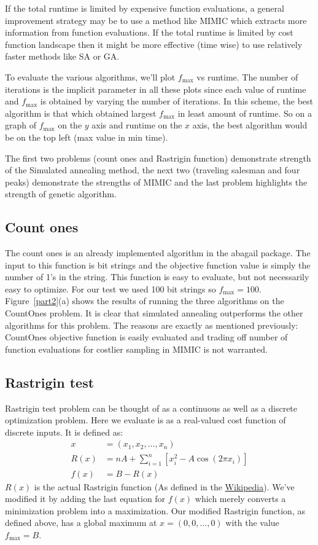 \documentclass[10pt,letterpaper]{article}
\begin{document}
If the total runtime is limited by expensive function evaluations, a general improvement strategy may be to use a method like MIMIC which extracts more information from function evaluations. If the total runtime is limited by cost function landscape then it might be more effective (time wise) to use relatively faster methods like SA or GA. 

To evaluate the various algorithms, we'll plot $f_{\text{max}}$ vs runtime. The number of iterations is the implicit parameter in all these plots since each value of runtime and $f_{\text{max}}$ is obtained by varying the number of iterations. In this scheme, the best algorithm is that which obtained largest $f_{\text{max}}$ in least amount of runtime. So on a graph of $f_{\text{max}}$ on the $y$ axis and runtime on the $x$ axis, the best algorithm would be on the top left (max value in min time).

The first two problems (count ones and Rastrigin function) demonstrate strength of the Simulated annealing method, the next two (traveling salesman and four peaks) demonstrate the strengths of MIMIC and the last problem highlights the strength of genetic algorithm.

\subsection{Count ones}
The count ones is an already implemented algorithm in the {\sc abagail} package. The input to this function is bit strings and the objective function value is simply the number of 1's in the string. This function is easy to evaluate, but not necessarily easy to optimize. For our test we used 100 bit strings so $f_{\text{max}} = 100$. Figure~\ref{part2}(a) shows the results of running the three algorithms on the CountOnes problem. It is clear that simulated annealing outperforms the other algorithms for this problem. The reasons are exactly as mentioned previously: CountOnes objective function is easily evaluated and trading off number of function evaluations for costlier sampling in MIMIC is not warranted. 
\subsection{Rastrigin test}
Rastrigin test problem can be thought of as a continuous as well as a discrete optimization problem. Here we evaluate is as a real-valued cost function of discrete inputs. It is defined as: 
\begin{align*}
x &= (x_1, x_2, \ldots, x_n)\\
R(x) &= nA + \sum_{i=1}^{n}\left[x_i^2 - A\cos(2\pi x_i)\right]\\
f(x) &= B -R(x)
\end{align*}
$R(x)$ is the actual Rastrigin function (As defined in the \href{https://en.wikipedia.org/wiki/Rastrigin_function}{Wikipedia}). We've modified it by adding the last equation for $f(x)$ which merely converts a minimization problem into a maximization. Our modified Rastrigin function, as defined above, has a global maximum at $x = (0,0, \ldots, 0)$ with the value  $f_{\text{max}} = B$.
\end{document}
